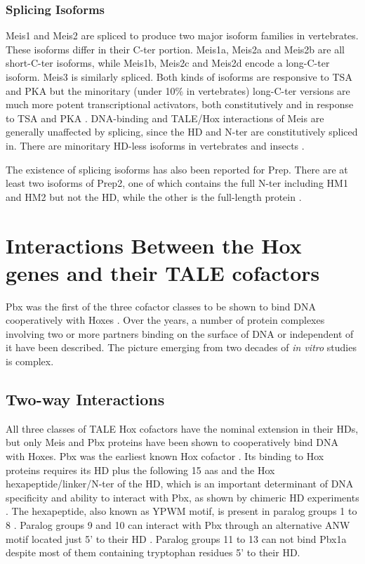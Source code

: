 \subsubsection{Splicing Isoforms}

Meis1 and Meis2 are spliced to produce two major isoform families in vertebrates. These isoforms differ in their \ac{C-ter} portion. Meis1a, Meis2a and Meis2b are all short-\ac{C-ter} isoforms, while Meis1b, Meis2c and Meis2d encode a long-\ac{C-ter} isoform. Meis3 is similarly spliced. Both kinds of isoforms are responsive to \ac{TSA} and \ac{PKA} but the minoritary (under 10\% in vertebrates) long-\ac{C-ter} versions are much more potent transcriptional activators, both constitutively and in response to \ac{TSA} and \ac{PKA} \parencite{Huang2005, Irimia2011}. DNA-binding and TALE/Hox interactions of Meis are generally unaffected by splicing, since the \ac{HD} and \ac{N-ter} are constitutively spliced in. There are minoritary \ac{HD}-less isoforms in vertebrates and insects \parencite{Irimia2011}. 

The existence of splicing isoforms has also been reported for Prep. There are at least two isoforms of Prep2, one of which contains the full \ac{N-ter} including HM1 and HM2 but not the \ac{HD}, while the other is the full-length protein \parencite{Haller2004}.

\section{Interactions Between the Hox genes and their TALE cofactors}
\label{sec:interactions}

Pbx was the first of the three cofactor classes to be shown to bind DNA cooperatively with Hoxes \parencite{Chan1994}. Over the years, a number of protein complexes involving two or more partners binding on the surface of DNA or independent of it have been described. The picture emerging from two decades of \textit{in vitro} studies is complex. 

\subsection{Two-way Interactions}

All three classes of \ac{TALE} Hox cofactors have the nominal extension in their \acp{HD}, but only Meis and Pbx proteins have been shown to cooperatively bind DNA with Hoxes. Pbx was the earliest known Hox cofactor \parencite{Peifer1990}. Its binding to Hox proteins requires its \ac{HD} plus the following 15 \acp{aa} and the Hox hexapeptide/linker/\ac{N-ter} of the \ac{HD}, which is an important determinant of DNA specificity and ability to interact with Pbx, as shown by chimeric \ac{HD} experiments \parencite{Chang1996, Phelan1997}. The hexapeptide, also known as YPWM motif, is present in paralog groups 1 to 8 \parencite{Chang1995, Passner1999}. Paralog groups 9 and 10 can interact with Pbx through an alternative ANW motif located just 5' to their \ac{HD} \parencite{Chang1996, Shen1997a}. Paralog groups 11 to 13 can not bind Pbx1a despite most of them containing tryptophan residues 5' to their \ac{HD}. 

